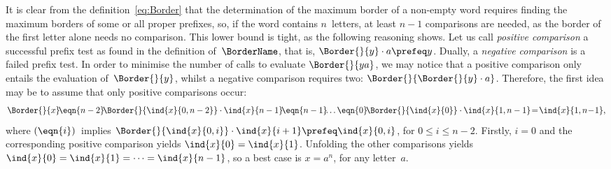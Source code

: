It is clear from the definition~\eqref{eq:Border} 
that the determination of the maximum border of a non\hyp{}empty word
requires finding the maximum borders of some or all proper prefixes,
so, if the word contains \(n\)~letters, at least \(n-1\) comparisons
are needed, as the border of the first letter alone needs no
comparison. This lower bound is tight, as the following reasoning
shows. Let us call \emph{positive comparison} a successful prefix test as
found in the definition of~\(\BorderName\), that is, \(\Border{}{y}
\cdot a \prefeq y\). Dually, a \emph{negative comparison} is a failed prefix test. In
order to minimise the number of calls to evaluate \(\Border{}{ya}\),
we may notice that a positive comparison only entails the evaluation
of~\(\Border{}{y}\), whilst a negative comparison requires two:
\(\Border{}{\Border{}{y} \cdot a}\). Therefore, the first idea may be
to assume that only positive comparisons occur:
\begin{equation*}
\Border{}{x} \!\eqn{n-2}\!
\Border{}{\ind{x}{0,n-2}} \cdot \ind{x}{n-1}
\!\eqn{n-1}\!\! \dots
\eqn{0}\! \Border{}{\ind{x}{0}} \cdot \ind{x}{1,n-1}
\!=\! \ind{x}{1,n\!-\!1},
\end{equation*}
where \((\smash{\eqn{i}})\)~implies \(\Border{}{\ind{x}{0,i}} \cdot
\ind{x}{i+1} \prefeq \ind{x}{0,i}\), for \(0 \leqslant i \leqslant
n-2\). Firstly, \(i=0\) and the corresponding positive comparison
yields \(\ind{x}{0} = \ind{x}{1}\). Unfolding the other comparisons
yields \(\ind{x}{0} = \ind{x}{1} = \dots = \ind{x}{n-1}\), so a best
case is \(x=a^n\), for any letter~\(a\).

